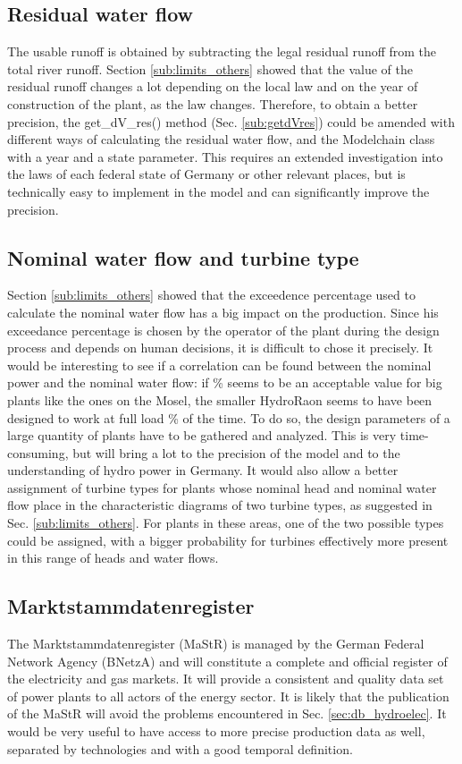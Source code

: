 \subsection{Residual water flow}
\label{sub:imp_dVres}
The usable runoff is obtained by subtracting the legal residual runoff from the total river runoff. Section \ref{sub:limits_others} showed that the value of the residual runoff changes a lot depending on the local law and on the year of construction of the plant, as the law changes. Therefore, to obtain a better precision, the get{\_}dV{\_}res() method (Sec. \ref{sub:getdVres}) could be amended with different ways of calculating the residual water flow, and the Modelchain class with a year and a state parameter. \newline
This requires an extended investigation into the laws of each federal state of Germany or other relevant places, but is technically easy to implement in the model and can significantly improve the precision.

\subsection{Nominal water flow and turbine type}
\label{sub:imp_dVn}
Section \ref{sub:limits_others} showed that the exceedence percentage used to calculate the nominal water flow has a big impact on the production. Since his exceedance percentage is chosen by the operator of the plant during the design process and depends on human decisions, it is difficult to chose it precisely. It would be interesting to see if a correlation can be found between the nominal power and the nominal water flow: if \unit[20]{\%} seems to be an acceptable value for big plants like the ones on the Mosel, the smaller HydroRaon seems to have been designed to work at full load \unit[30]{\%} of the time. To do so, the design parameters of a large quantity of plants have to be gathered and analyzed. This is very time-consuming, but will bring a lot to the precision of the model and to the understanding of hydro power in Germany. \newline
It would also allow a better assignment of turbine types for plants whose nominal head and nominal water flow place in the characteristic diagrams of two turbine types, as suggested in Sec. \ref{sub:limits_others}. For plants in these areas, one of the two possible types could be assigned, with a bigger probability for turbines effectively more present in this range of heads and water flows.

\subsection{Marktstammdatenregister}
\label{sub:imp_data}
The Marktstammdatenregister (MaStR) is managed by the German Federal Network Agency (BNetzA) and will constitute a complete and official register of the electricity and gas markets. It will provide a consistent and quality data set of power plants to all actors of the energy sector. It is likely that the publication of the MaStR will avoid the problems encountered in Sec. \ref{sec:db_hydroelec}. It would be very useful to have access to more precise production data as well, separated by technologies and with a good temporal definition.


